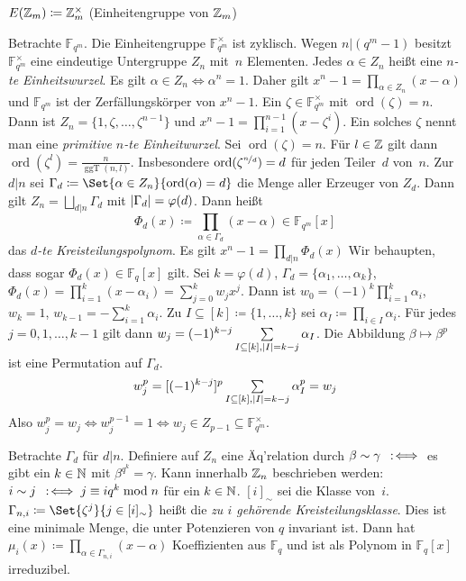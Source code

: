 \documentclass{cheat-sheet}
\newcommand{\F}{\mathbb{F}} %
\newcommand{\divides}{|} %
\DeclareMathOperator{\ggT}{ggT} %
\DeclareMathOperator{\ord}{ord} %
\begin{document}
\begin{nota}
  $E(\mathbb{Z}_m) \coloneqq \mathbb{Z}_m^\times$ (Einheitengruppe von $\mathbb{Z}_m$)
\end{nota}

\begin{bem}
  Betrachte $\F_{q^m}$.
  Die Einheitengruppe $\F_{q^m}^{\times}$ ist zyklisch.
  Wegen $n \divides (q^m - 1)$ besitzt $\F_{q^m}^{\times}$ eine eindeutige Untergruppe $Z_n$ mit~$n$ Elementen.
  Jedes $\alpha \in Z_n$ heißt eine \emph{$n$-te Einheitswurzel}.
  Es gilt $\alpha \in Z_n \iff \alpha^n = 1$.
  Daher gilt $x^n - 1 = \prod_{\alpha \in Z_n} (x-\alpha)$ und $\F_{q^m}$ ist der Zerfällungskörper von $x^n - 1$.
  Ein $\zeta \in \F_{q^m}^\times$ mit $\ord(\zeta) = n$.
  Dann ist $Z_n = \{ 1, \zeta, \ldots, \zeta^{n-1} \}$ und $x^n - 1 = \prod_{i=1}^{n-1} (x - \zeta^i)$.
  Ein solches $\zeta$ nennt man eine \emph{primitive $n$-te Einheitwurzel}.
  Sei $\ord(\zeta) = n$.
  Für $l \in \mathbb{Z}$ gilt dann $\ord(\zeta^l) = \tfrac{n}{\ggT(n,l)}$.
  Insbesondere $\ord(\zeta^{\nicefrac{n}{d}}) = d$ für jeden Teiler~$d$ von~$n$.
  Zur $d \divides n$ sei $\Gamma_d \coloneqq \Set{\alpha \in Z_n}{\ord(\alpha) = d}$ die Menge aller Erzeuger von $Z_d$.
  Dann gilt $Z_n = \bigsqcup_{d \divides n} \Gamma_d$ mit $\lvert\Gamma_d\rvert = \varphi(d)$.
  Dann heißt
  \[
    \Phi_d(x) \coloneqq \prod_{\alpha \in \Gamma_d} (x - \alpha) \in \F_{q^m}[x]
  \]
  das \emph{$d$-te Kreisteilungspolynom}.
  Es gilt $x^n - 1 = \prod_{d \divides n} \Phi_d(x)$
  Wir behaupten, dass sogar $\Phi_d(x) \in \F_q[x]$ gilt.
  Sei $k = \varphi(d)$, $\Gamma_d = \{ \alpha_1, \ldots, \alpha_k \}$, $\Phi_d(x) = \prod_{i=1}^k (x - \alpha_i) = \sum_{j=0}^k w_j x^j$.
  Dann ist $w_0 = (-1)^k \prod_{i=1}^k \alpha_i$, $w_k = 1$, $w_{k-1} = - \sum_{i = 1}^k \alpha_i$.
  Zu $I \subseteq [k] \coloneqq \{ 1, \ldots, k \}$ sei $\alpha_I \coloneqq \prod_{i \in I} \alpha_i$.
  Für jedes $j = 0, 1, \ldots, k-1$ gilt dann $w_j = (-1)^{k-j} \sum_{I \subseteq [k], \abs{I} = k - j} \alpha_I$.
  Die Abbildung $\beta \mapsto \beta^p$ ist eine Permutation auf $\Gamma_d$.
  \[
    w_j^p = [(-1)^{k-j}]^{p} \sum_{I \subseteq [k], \abs{I} = k - j} \alpha_I^p = w_j
  \]
  Also $w_j^p = w_j \iff w_j^{p-1} = 1 \iff w_j \in Z_{p-1} \subseteq \F_{q^m}^\times$.
\end{bem}

Betrachte $\Gamma_d$ für $d \divides n$.
Definiere auf $Z_n$ eine Äq'relation durch $\beta \sim \gamma \enspace:\!\iff $ es gibt ein $k \in \mathbb{N}$ mit $\beta^{q^k} = \gamma$.
Kann innerhalb $\mathbb{Z}_n$ beschrieben werden: $i \sim j \enspace:\!\iff j \equiv i q^k \bmod{n}$ für ein $k \in \mathbb{N}$.
$[i]_\sim$ sei die Klasse von~$i$.
$\Gamma_{n,i} \coloneqq \Set{\zeta^j}{j \in [i]_\sim}$ heißt die \emph{zu $i$ gehörende Kreisteilungsklasse}.
Dies ist eine minimale Menge, die unter Potenzieren von $q$ invariant ist.
Dann hat $\mu_i(x) \coloneqq \prod_{\alpha \in \Gamma_{n,i}} (x - \alpha)$ Koeffizienten aus $\F_q$ und ist als Polynom in $\F_q[x]$ irreduzibel.
\end{document}
